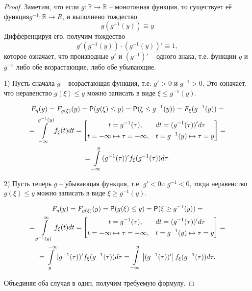 \begin{proof}
Заметим, что если $g :\mathbb{R} \to \mathbb{R}$  -- монотонная функция, то существует её функция$ g^{-1} :\mathbb{R} \to R$, и выполнено тождество
\begin{equation*}
	g(g^{-1}(y))\equiv y 	
\end{equation*} 
Дифференцируя его, получим тождество
\begin{equation*}
	g'(g^{-1}(y)) \cdot (g^{-1} (y))' \equiv 1,
\end{equation*}
которое означает, что производные $g′$ и $(g^{-1})'$ --
одного знака, т.е. функции $g$ и $g^{-1}$ либо обе возрастающие, либо обе убывающие.


1) Пусть сначала $g$ -- возрастающая функция, т.е. $g' > 0$ и $g^{-1} > 0$. Это означает, что неравенство $g(\xi) \leq y$ можно записать в виде $ \xi \leq g^{-1}(y)$.

\begin{gather*}
	F_{\eta}(y) = F_{g(\xi)}(y) = \P(g(\xi) \leq y) = \P(\xi \leq g^{-1} (y)) = F_\xi (g^{-1} (y)) =\\=
	\int\limits^{g^{-1}(y)}_{-\infty} f_\xi(t) dt=
	\left[
	\begin{aligned}
		t = g^{-1} (\tau ),\qquad & dt = (g^{-1}(\tau ))' d\tau\\
		t = -\infty \mapsto \tau = -\infty,\quad & t = g^{-1}(y) \mapsto \tau = y
	\end{aligned}\right]=\\=
	\int\limits_{-\infty}^y (g^{-1}(\tau))' f_\xi(g^{-1}(\tau)) d\tau.
\end{gather*}



2) Пусть теперь $g$ -- убывающая функция, т.е. $g' < 0 $и $g^{-1} < 0$, тогда
неравенство $g(\xi) \leq y$ можно записать в виде $\xi \geq g^{-1} (y)$.

\begin{gather*}
	F_{\eta}(y) = F_{g(\xi)}(y) = \P(g(\xi) \leq y) = \P(\xi \geq g^{-1} (y)) =\\=
	\int\limits_{g^{-1}(y)}^{\infty} f_\xi(t) dt=
	\left[
	\begin{aligned}
		t = g^{-1} (\tau ),\qquad & dt = (g^{-1}(\tau ))' d\tau\\
		t = -\infty \mapsto \tau = -\infty,\quad & t = g^{-1}(y) \mapsto \tau = y
	\end{aligned}\right]=\\=\int\limits^{-\infty}_y (g^{-1}(\tau))' f_\xi(g^{-1}(\tau)) d\tau=
	\int\limits_{-\infty}^y \left|(g^{-1}(\tau))'\right| f_\xi(g^{-1}(\tau)) d\tau.
\end{gather*}

Объединяя оба случая в один, получим требуемую формулу.
\end{proof}

